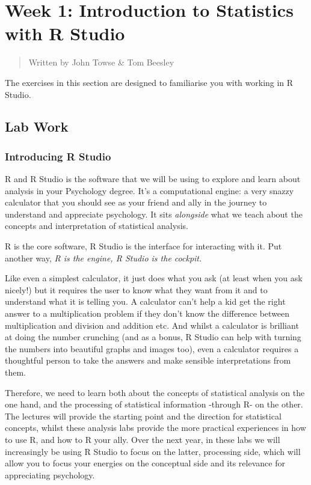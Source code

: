 \documentclass[
]{book}
\begin{document}
\hypertarget{week-1-introduction-to-statistics-with-r-studio}{%
\chapter{Week 1: Introduction to Statistics with R Studio}\label{week-1-introduction-to-statistics-with-r-studio}}

\begin{quote}
Written by John Towse \& Tom Beesley
\end{quote}

The exercises in this section are designed to familiarise you with working in R Studio.

\hypertarget{lab-work}{%
\section{Lab Work}\label{lab-work}}

\hypertarget{introducing-r-studio}{%
\subsection{Introducing R Studio}\label{introducing-r-studio}}

R and R Studio is the software that we will be using to explore and learn about analysis in your Psychology degree. It's a computational engine: a very snazzy calculator that you should see as your friend and ally in the journey to understand and appreciate psychology. It sits \emph{alongside} what we teach about the concepts and interpretation of statistical analysis.

R is the core software, R Studio is the interface for interacting with it. Put another way, \emph{R is the engine, R Studio is the cockpit.}

Like even a simplest calculator, it just does what you ask (at least when you ask nicely!) but it requires the user to know what they want from it and to understand what it is telling you. A calculator can't help a kid get the right answer to a multiplication problem if they don't know the difference between multiplication and division and addition etc. And whilst a calculator is brilliant at doing the number crunching (and as a bonus, R Studio can help with turning the numbers into beautiful graphs and images too), even a calculator requires a thoughtful person to take the answers and make sensible interpretations from them.

Therefore, we need to learn both about the concepts of statistical analysis on the one hand, and the processing of statistical information -through R- on the other. The lectures will provide the starting point and the direction for statistical concepts, whilst these analysis labs provide the more practical experiences in how to use R, and how to R your ally. Over the next year, in these labs we will increasingly be using R Studio to focus on the latter, processing side, which will allow you to focus your energies on the conceptual side and its relevance for appreciating psychology.
\end{document}
